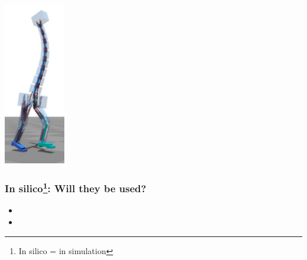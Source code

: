 \documentclass{beamer}
\begin{document}
\begin{frame}
\includegraphics[width=0.2\textwidth]{figs/limiters/5.png}
\end{frame}

\begin{frame}
	\frametitle{In silico\footnote{In silico = in simulation}: Will they be used?}
	\begin{itemize}
	\item 
	\item 
	\end{itemize}
\end{frame}


\note{}
\end{document}
